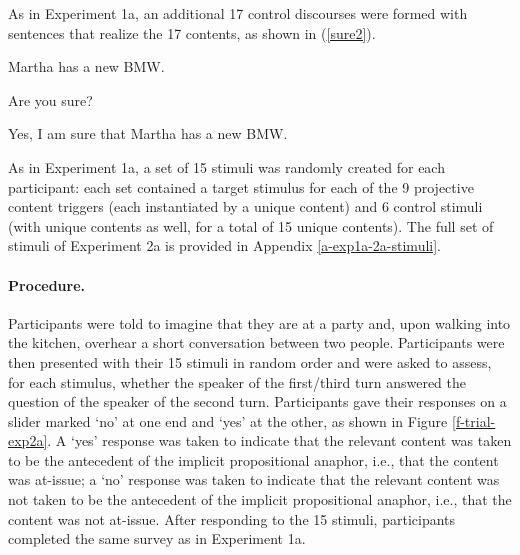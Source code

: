 \documentclass[11pt,fleqn]{article}
\newcommand{\6}{\mbox{$[\hspace*{-.6mm}[$}}
\newcommand{\9}{\mbox{$]\hspace*{-.6mm}]$}}
\begin{document}
As in Experiment 1a, an additional 17 control discourses were formed with sentences that realize the 17 contents, as shown in (\ref{sure2}).

\begin{exe}
\ex\label{sure2}
\begin{xlist}
 Martha has a new BMW.

 Are you sure?

 Yes, I am sure that Martha has a new BMW.
\end{xlist}
\end{exe}
As in Experiment 1a, a set of 15 stimuli was randomly created for each participant: each set contained a target stimulus for each of the 9 projective content triggers (each  instantiated by a unique content) and 6 control stimuli (with unique contents as well, for a total of 15 unique contents). The full set of stimuli of Experiment 2a is provided in Appendix \ref{a-exp1a-2a-stimuli}.

\paragraph{Procedure.} Participants were told to imagine that they are at a party and, upon walking into the kitchen, overhear a short conversation between two people. Participants were then presented with their 15 stimuli in random order and were asked to assess, for each stimulus, whether the speaker of the first/third turn answered the question of the speaker of the second turn. Participants gave their responses on a slider marked `no' at one end and `yes' at the other, as shown in Figure \ref{f-trial-exp2a}. A `yes' response was taken to indicate that the relevant content was taken to be the antecedent of the implicit propositional anaphor, i.e., that the content was at-issue; a `no' response was taken to indicate that the relevant content was not taken to be the antecedent of the implicit propositional anaphor, i.e., that the content was not at-issue.
After responding to the 15 stimuli, participants completed the same survey as in Experiment 1a.
\end{document}
